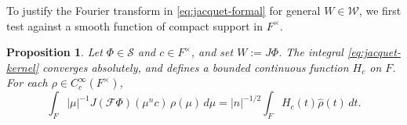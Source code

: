 \documentclass[reqno]{amsart}
\theoremstyle{plain}
\newtheorem{proposition}[theorem]{Proposition}
\theoremstyle{definition}
\theoremstyle{itplain}
\numberwithin{equation}{section}
\numberwithin{theorem}{section}
\begin{document}
To justify the Fourier transform in \eqref{eq:jacquet-formal} for general $W \in \mathcal{W}$, we first test against a smooth function of compact support in $F^\times$.

\begin{proposition}\label{proposition:jacquet-weak}
  Let $\Phi \in \mathcal{S}$ and $c \in F^\times$, and set $W := J \Phi$.  The integral \eqref{eq:jacquet-kernel} converges absolutely, and defines a bounded continuous function $H_c$ on $F$.  For each $\rho \in C_c^\infty(F^\times)$,
  \begin{equation}\label{eq:jacquet-weak}
    \int_{F} \lvert \mu \rvert^{-1} J(\mathcal{F} \Phi)(\mu^n c) \, \rho(\mu) \, d \mu
    =
    \lvert n \rvert^{-1/2} \int_F H_c(t) \hat{\rho}(t) \, d t.
  \end{equation}
\end{proposition}
\end{document}
